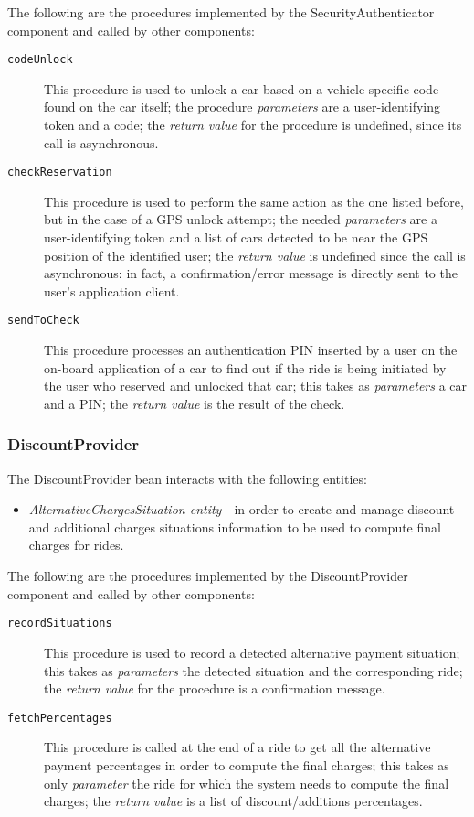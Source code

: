 The following are the procedures implemented by the SecurityAuthenticator component and called by other components:
\begin{description}
\item[\texttt{codeUnlock}] This procedure is used to unlock a car based on a vehicle-specific code found on the car itself; the procedure \textit{parameters} are a user-identifying token and a code; the \textit{return value} for the procedure is undefined, since its call is asynchronous.
\item[\texttt{checkReservation}] This procedure is used to perform the same action as the one listed before, but in the case of a GPS unlock attempt; the needed \textit{parameters} are a user-identifying token and a list of cars detected to be near the GPS position of the identified user; the \textit{return value} is undefined since the call is asynchronous: in fact, a confirmation/error message is directly sent to the user's application client.
\item[\texttt{sendToCheck}] This procedure processes an authentication PIN inserted by a user on the on-board application of a car to find out if the ride is being initiated by the user who reserved and unlocked that car; this takes as \textit{parameters} a car and a PIN; the \textit{return value} is the result of the check.
\end{description}
\subsubsection{DiscountProvider}
The DiscountProvider bean interacts with the following entities:
\begin{itemize}
\item \textit{AlternativeChargesSituation entity} - in order to create and manage discount and additional charges situations information to be used to compute final charges for rides.
\end{itemize}

The following are the procedures implemented by the DiscountProvider component and called by other components:
\begin{description}
\item[\texttt{recordSituations}] This procedure is used to record a detected alternative payment situation; this takes as \textit{parameters} the detected situation and the corresponding ride; the \textit{return value} for the procedure is a confirmation message.
\item[\texttt{fetchPercentages}] This procedure is called at the end of a ride to get all the alternative payment percentages in order to compute the final charges; this takes as only \textit{parameter} the ride for which the system needs to compute the final charges; the \textit{return value} is a list of discount/additions percentages.
\end{description}
